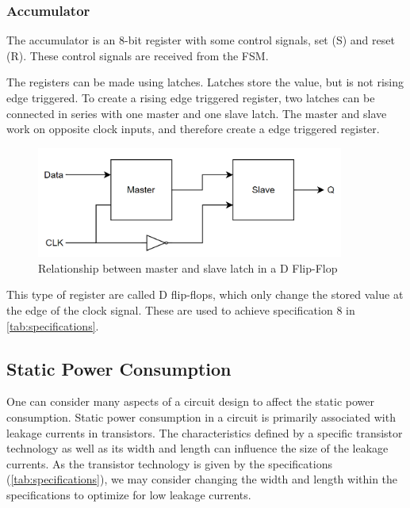 \subsubsection{Accumulator}
The accumulator is an 8-bit register with some control signals, set (S) and reset (R). These control signals are received from the FSM. 

The registers can be made using latches. Latches store the value, but is not rising edge triggered. To create a rising edge triggered register, two latches can be connected in series with one master and one slave latch. The master and slave work on opposite clock inputs, and therefore create a edge triggered register. 

\begin{figure}[H]
    \centering
    \includegraphics[width=0.9\textwidth]{Figures/DFF_Block.png}
    \caption{Relationship between master and slave latch in a D Flip-Flop}
    \label{fig:enter-label}
\end{figure}

This type of register are called D flip-flops, which only change the stored value at the edge of the clock signal. These are used to achieve specification 8 in \autoref{tab:specifications}. 



\subsection{Static Power Consumption}
\label{subsec:low_power}

One can consider many aspects of a circuit design to affect the static power consumption. Static power consumption in a circuit is primarily associated with leakage currents in transistors. The characteristics defined by a specific transistor technology as well as its width and length can influence the size of the leakage currents. As the transistor technology is given by the specifications (\ref{tab:specifications}), we may consider changing the width and length within the specifications to optimize for low leakage currents. 

